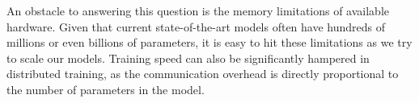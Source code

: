 

An obstacle to answering this question is the memory limitations of available hardware.
Given that current state-of-the-art models often have hundreds of millions or even billions of parameters, it is easy to hit these limitations as we try to scale our models.
Training speed can also be significantly hampered in distributed training, as the communication overhead is directly proportional to the number of parameters in the model.





